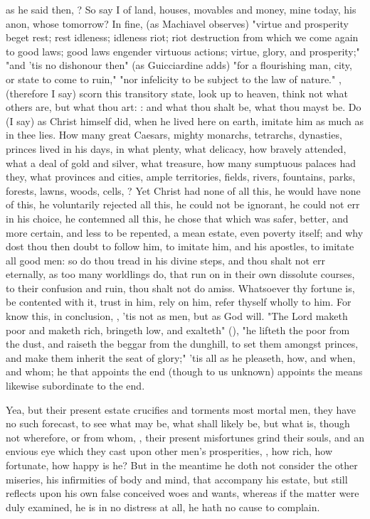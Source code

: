 {as he said then, ? So say I of land, houses, movables and money, mine today, his anon, whose tomorrow? In fine, (as Machiavel observes) "virtue and prosperity beget rest; rest idleness; idleness riot; riot destruction from which we come again to good laws; good laws engender virtuous actions; virtue, glory, and prosperity;" "and 'tis no dishonour then" (as Guicciardine adds) "for a flourishing man, city, or state to come to ruin," "nor infelicity to be subject to the law of nature." , (therefore I say) scorn this transitory state, look up to heaven, think not what others are, but what thou art: : and what thou shalt be, what thou mayst be. Do (I say) as Christ himself did, when he lived here on earth, imitate him as much as in thee lies. How many great Caesars, mighty monarchs, tetrarchs, dynasties, princes lived in his days, in what plenty, what delicacy, how bravely attended, what a deal of gold and silver, what treasure, how many sumptuous palaces had they, what provinces and cities, ample territories, fields, rivers, fountains, parks, forests, lawns, woods, cells, \etc{}? Yet Christ had none of all this, he would have none of this, he voluntarily rejected all this, he could not be ignorant, he could not err in his choice, he contemned all this, he chose that which was safer, better, and more certain, and less to be repented, a mean estate, even poverty itself; and why dost thou then doubt to follow him, to imitate him, and his apostles, to imitate all good men: so do thou tread in his divine steps, and thou shalt not err eternally, as too many worldlings do, that run on in their own dissolute courses, to their confusion and ruin, thou shalt not do amiss. Whatsoever thy fortune is, be contented with it, trust in him, rely on him, refer thyself wholly to him. For know this, in conclusion, , 'tis not as men, but as God will. "The Lord maketh poor and maketh rich, bringeth low, and exalteth" (), "he lifteth the poor from the dust, and raiseth the beggar from the dunghill, to set them amongst princes, and make them inherit the seat of glory;" 'tis all as he pleaseth, how, and when, and whom; he that appoints the end (though to us unknown) appoints the means likewise subordinate to the end.

Yea, but their present estate crucifies and torments most mortal men, they have no such forecast, to see what may be, what shall likely be, but what is, though not wherefore, or from whom, , their present misfortunes grind their souls, and an envious eye which they cast upon other men's prosperities, , how rich, how fortunate, how happy is he? But in the meantime he doth not consider the other miseries, his infirmities of body and mind, that accompany his estate, but still reflects upon his own false conceived woes and wants, whereas if the matter were duly examined, he is in no distress at all, he hath no cause to complain.

}
